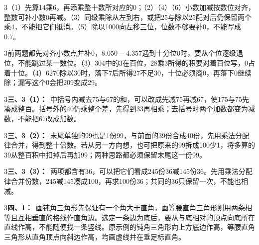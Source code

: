 \documentclass[multi=snippet,border={5bp 20bp 5bp 5bp}]{standalone}
\newenvironment{snippet}[3]{\begin{minipage}{#1bp}\color{answerred}\fontsize{#2}{#3}\selectfont\raggedright}{\end{minipage}}
\begin{document}
\begin{snippet}{505}{11.5}{14}\begin{multicols}{3}\raggedcolumns （1）先算14乘6，再添乘整十数所对应的0；（2）（4）（6）小数加减按数位对齐，整数可补小数0再减。（3）同级乘除从左到右，或把25与除以25配对后仍保留两个乘4，不能把它们抵消。（5）除以1000向左移三位，位数不够要补0，不能写成0.7。\end{multicols}\end{snippet}
\begin{snippet}{505}{11.5}{14}\begin{multicols}{3}\raggedcolumns 前两题都先对齐小数点并补0，\(8.050-4.357\)\allowbreak 遇到十分位0时，要从个位逐级退位，不能跳过某一数位。（3）304中的3在百位，28乘3所得的积要对着百位写，0占着十位。（4）6270除以30时，落下7后所得27不足30，十位必须商0，再落下0继续除；漏写这个0会把209变成29。\end{multicols}\end{snippet}
\begin{snippet}{505}{11.5}{14}\begin{multicols}{3}\raggedcolumns \textbf{三、3（1）：}\ 中括号内减去75与67的和，可以改成先减75再减67，使175与75先凑成整百。括号外的40仍乘整个差，先得到33再相乘；去括号时两个加数都变为减数，不能把67改成加数。\end{multicols}\end{snippet}
\begin{snippet}{505}{11.5}{14}\begin{multicols}{3}\raggedcolumns \textbf{三、3（2）：}\ 末尾单独的99也是1份99，与前面的39份合成40份，先用乘法分配律合并，得到整十倍数。若从另一方向想，也可把原来的99拆成100少1，将多算的39从整百积中扣掉后再加99；两种思路都必须保留末尾这一份99。\end{multicols}\end{snippet}
\begin{snippet}{505}{11.5}{14}\begin{multicols}{3}\raggedcolumns \textbf{三、3（3）：}\ 两项都含有36，可以把它们看成245份36减145份36。先用乘法分配律合并份数，245减145凑成100，再求100份36；共同的36只保留一次，不能也相减。\end{multicols}\end{snippet}
\begin{snippet}{505}{11.5}{14}\begin{multicols}{3}\raggedcolumns \textbf{四、1：}\ 画钝角三角形先保证有一个角大于直角，画等腰直角三角形则用两条相等且互相垂直的格线作直角边。选定一条边为底后，要从与底相对的顶点向底所在直线作高，不能随便找一条竖线。原示例的钝角三角形向上方底边作高，等腰直角三角形从直角顶点向斜边作高，均画虚线并在垂足标直角。\end{multicols}\end{snippet}
\end{document}
